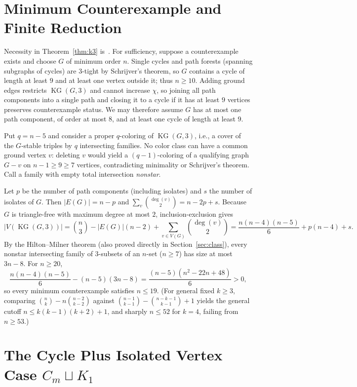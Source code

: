 \documentclass[11pt]{article}
\DeclareMathOperator{\KG}{KG}
\begin{document}
\section{Minimum Counterexample and Finite Reduction}

Necessity in Theorem~\ref{thm:k3} is~\cite[Theorem~1.2]{AHKS2026}. For sufficiency, suppose a counterexample exists and choose $G$ of minimum order $n$. Single cycles and path forests (spanning subgraphs of cycles) are $3$-tight by Schrijver's theorem, so $G$ contains a cycle of length at least $9$ and at least one vertex outside it; thus $n \ge 10$. Adding ground edges restricts $\KG(G, 3)$ and cannot increase $\chi$, so joining all path components into a single path and closing it to a cycle if it has at least $9$ vertices preserves counterexample status. We may therefore assume $G$ has at most one path component, of order at most $8$, and at least one cycle of length at least $9$.

Put $q = n - 5$ and consider a proper $q$-coloring of $\KG(G, 3)$, i.e., a cover of the $G$-stable triples by $q$ intersecting families. No color class can have a common ground vertex $v$: deleting $v$ would yield a $(q - 1)$-coloring of a qualifying graph $G - v$ on $n - 1 \ge 9 \ge 7$ vertices, contradicting minimality or Schrijver's theorem. Call a family with empty total intersection \emph{nonstar}.

Let $p$ be the number of path components (including isolates) and $s$ the number of isolates of $G$. Then $|E(G)| = n - p$ and $\sum_v \binom{\deg(v)}{2} = n - 2p + s$. Because $G$ is triangle-free with maximum degree at most $2$, inclusion-exclusion gives
\[
|V(\KG(G, 3))| = \binom{n}{3} - |E(G)|(n - 2) + \sum_{v \in V(G)} \binom{\deg(v)}{2} = \frac{n(n - 4)(n - 5)}{6} + p(n - 4) + s.
\]
By the Hilton--Milner theorem (also proved directly in Section~\ref{sec:class}), every nonstar intersecting family of $3$-subsets of an $n$-set ($n \ge 7$) has size at most $3n - 8$. For $n \ge 20$,
\[
\frac{n(n - 4)(n - 5)}{6} - (n - 5)(3n - 8) = \frac{(n - 5)(n^2 - 22n + 48)}{6} > 0,
\]
so every minimum counterexample satisfies $n \le 19$. (For general fixed $k \ge 3$, comparing $\binom{n}{k} - n\binom{n-2}{k-2}$ against $\binom{n-1}{k-1} - \binom{n-k-1}{k-1} + 1$ yields the general cutoff $n \le k(k - 1)(k + 2) + 1$, and sharply $n \le 52$ for $k = 4$, failing from $n \ge 53$.)

\section{The Cycle Plus Isolated Vertex Case $C_m \sqcup K_1$}
\end{document}
